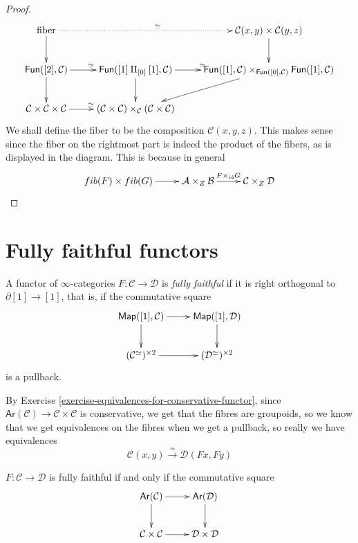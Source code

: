 \begin{proof}
$$
\xymatrix{
\text{fiber}\ar[d]\ar@{.>}[rr]^{\simeq}&&
\mathcal{C}(x,y)\times \mathcal{C}(y,z)\ar[d]\\
\mathsf{Fun}([2],\mathcal{C})\ar[r]^{\simeq}\ar[d]&
\mathsf{Fun}([1]\amalg_{[0]}[1],\mathcal{C})\ar[r]^{\simeq}\ar[d]
&\mathsf{Fun}([1],\mathcal{C})\times_{\mathsf{Fun}([0],\mathcal{C})}
\mathsf{Fun}([1],\mathcal{C})\ar[ld]\\
\mathcal{C}\times\mathcal{C}\times\mathcal{C}\ar[r]^{\simeq}&
(\mathcal{C} \times \mathcal{C})
\times_{\mathcal{C}}(\mathcal{C}\times\mathcal{C})
}
$$
We shall define the fiber to be the
composition $\mathcal{C}(x,y,z)$.
This makes sense since
the fiber on the rightmost part
is indeed the product of the fibers, 
as is displayed in the diagram.
This is because in general
$$
\xymatrix{
fib(F)\times fib(G)\ar[r]&  \mathcal{A}\times_Z \mathcal{B}
\ar[r]^{F\times_{\text{id}}G}&
\mathcal{C}\times_Z \mathcal{D}
}
$$
\end{proof}


\section{Fully faithful functors}
\label{section-fully-faithful-functors}

\begin{definition}
\label{definition-fully-faithful}
A functor of $\infty$-categories $F:\mathcal{C} \to \mathcal{D}$ 
is {\it fully faithful} if it is
right orthogonal to $\partial[1] \to [1]$,
that is, if the commutative square
$$
\xymatrix{
\mathsf{Map}([1],\mathcal{C})\ar[r]\ar[d]&
\mathsf{Map}([1],\mathcal{D})\ar[d]\\
(\mathcal{C}^\simeq)^{\times 2}\ar[r]&
(\mathcal{D}^\simeq)^{\times 2}
}
$$
is a pullback.
\end{definition}

By Exercise \ref{exercise-equivalences-for-conservative-functor}, since 
$\mathsf{Ar}(\mathcal{C})\to \mathcal{C}\times\mathcal{C}$
is conservative, we get that the fibres
are groupoids, so we know that we get equivalences
on the fibres when we get a pullback, so really we have
equivalences
$$
\mathcal{C}(x,y)\xrightarrow{\simeq}\mathcal{D}(Fx,Fy)
$$
\begin{proposition}
\label{proposition-fully-faithfull-iff-pullback}
$F:\mathcal{C} \to \mathcal{D}$ is fully faithful
if and only if the commutative square
$$
\xymatrix{
\mathsf{Ar}(\mathcal{C})\ar[r]\ar[d]&\mathsf{Ar}(\mathcal{D})\ar[d]\\
\mathcal{C}\times\mathcal{C}\ar[r]&\mathcal{D}\times\mathcal{D}
}
$$
\end{proposition}

